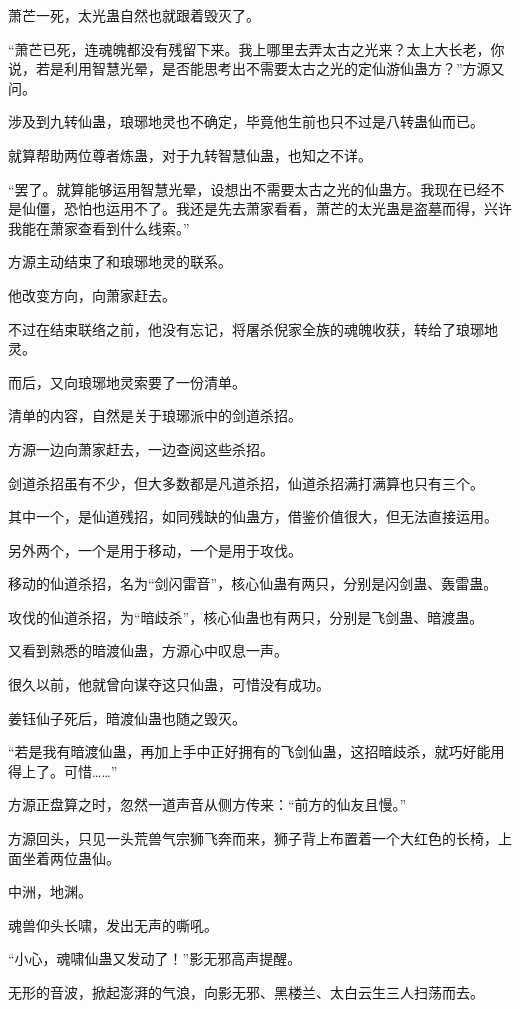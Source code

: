 \begin{this_body}
萧芒一死，太光蛊自然也就跟着毁灭了。

“萧芒已死，连魂魄都没有残留下来。我上哪里去弄太古之光来？太上大长老，你说，若是利用智慧光晕，是否能思考出不需要太古之光的定仙游仙蛊方？”方源又问。

涉及到九转仙蛊，琅琊地灵也不确定，毕竟他生前也只不过是八转蛊仙而已。

就算帮助两位尊者炼蛊，对于九转智慧仙蛊，也知之不详。

“罢了。就算能够运用智慧光晕，设想出不需要太古之光的仙蛊方。我现在已经不是仙僵，恐怕也运用不了。我还是先去萧家看看，萧芒的太光蛊是盗墓而得，兴许我能在萧家查看到什么线索。”

方源主动结束了和琅琊地灵的联系。

他改变方向，向萧家赶去。

不过在结束联络之前，他没有忘记，将屠杀倪家全族的魂魄收获，转给了琅琊地灵。

而后，又向琅琊地灵索要了一份清单。

清单的内容，自然是关于琅琊派中的剑道杀招。

方源一边向萧家赶去，一边查阅这些杀招。

剑道杀招虽有不少，但大多数都是凡道杀招，仙道杀招满打满算也只有三个。

其中一个，是仙道残招，如同残缺的仙蛊方，借鉴价值很大，但无法直接运用。

另外两个，一个是用于移动，一个是用于攻伐。

移动的仙道杀招，名为“剑闪雷音”，核心仙蛊有两只，分别是闪剑蛊、轰雷蛊。

攻伐的仙道杀招，为“暗歧杀”，核心仙蛊也有两只，分别是飞剑蛊、暗渡蛊。

又看到熟悉的暗渡仙蛊，方源心中叹息一声。

很久以前，他就曾向谋夺这只仙蛊，可惜没有成功。

姜钰仙子死后，暗渡仙蛊也随之毁灭。

“若是我有暗渡仙蛊，再加上手中正好拥有的飞剑仙蛊，这招暗歧杀，就巧好能用得上了。可惜……”

方源正盘算之时，忽然一道声音从侧方传来：“前方的仙友且慢。”

方源回头，只见一头荒兽气宗狮飞奔而来，狮子背上布置着一个大红色的长椅，上面坐着两位蛊仙。

中洲，地渊。

魂兽仰头长啸，发出无声的嘶吼。

“小心，魂啸仙蛊又发动了！”影无邪高声提醒。

无形的音波，掀起澎湃的气浪，向影无邪、黑楼兰、太白云生三人扫荡而去。


\end{this_body}
